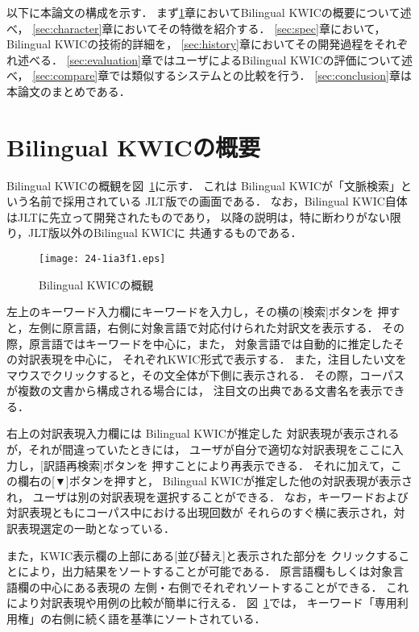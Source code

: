 \documentclass[japanese]{jnlp_1.4}
\begin{document}
以下に本論文の構成を示す．
まず\ref{sec:summary}章においてBilingual KWICの概要について述べ，
\ref{sec:character}章においてその特徴を紹介する．
\ref{sec:spec}章において，Bilingual KWICの技術的詳細を，
\ref{sec:history}章においてその開発過程をそれぞれ述べる．
\ref{sec:evaluation}章ではユーザによるBilingual KWICの評価について述べ，
\ref{sec:compare}章では類似するシステムとの比較を行う．
\ref{sec:conclusion}章は本論文のまとめである．


\section{Bilingual KWICの概要}
\label{sec:summary}

Bilingual KWICの概観を図~\ref{fig:Bilingual KWIC}に示す．
これは Bilingual KWICが「文脈検索」という名前で採用されている
JLT版での画面である．
なお，Bilingual KWIC自体はJLTに先立って開発されたものであり，
以降の説明は，特に断わりがない限り，JLT版以外のBilingual KWICに
共通するものである．

\begin{figure}[b]
\begin{center}
\texttt{[image: 24-1ia3f1.eps]}
\end{center}
\caption{Bilingual KWICの概観}
\label{fig:Bilingual KWIC}
\end{figure}

左上のキーワード入力欄にキーワードを入力し，その横の[検索]ボタンを
押すと，左側に原言語，右側に対象言語で対応付けられた対訳文を表示する．
その際，原言語ではキーワードを中心に，また，
対象言語では自動的に推定したその対訳表現を中心に，
それぞれKWIC形式で表示する．
また，注目したい文をマウスでクリックすると，その文全体が下側に表示される．
その際，コーパスが複数の文書から構成される場合には，
注目文の出典である文書名を表示できる．

右上の対訳表現入力欄には Bilingual KWICが推定した
対訳表現が表示されるが，それが間違っていたときには，
ユーザが自分で適切な対訳表現をここに入力し，[訳語再検索]ボタンを
押すことにより再表示できる．
それに加えて，この欄右の[▼]ボタンを押すと，
Bilingual KWICが推定した他の対訳表現が表示され，
ユーザは別の対訳表現を選択することができる．
なお，キーワードおよび対訳表現ともにコーパス中における出現回数が
それらのすぐ横に表示され，対訳表現選定の一助となっている．

また，KWIC表示欄の上部にある[並び替え]と表示された部分を
クリックすることにより，出力結果をソートすることが可能である．
原言語欄もしくは対象言語欄の中心にある表現の
左側・右側でそれぞれソートすることができる．
これにより対訳表現や用例の比較が簡単に行える．
図~\ref{fig:Bilingual KWIC}では，
キーワード「専用利用権」の右側に続く語を基準にソートされている．
\end{document}
